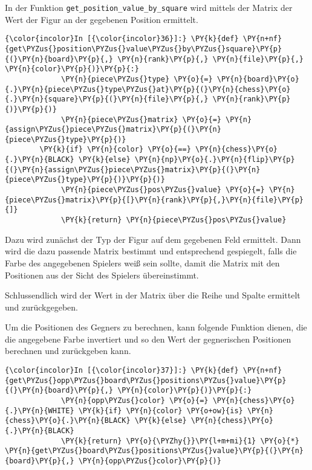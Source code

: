 In der Funktion \texttt{get\_position\_value\_by\_square} wird mittels
der Matrix der Wert der Figur an der gegebenen Position ermittelt.

    \begin{Verbatim}[commandchars=\\\{\}]
{\color{incolor}In [{\color{incolor}36}]:} \PY{k}{def} \PY{n+nf}{get\PYZus{}position\PYZus{}value\PYZus{}by\PYZus{}square}\PY{p}{(}\PY{n}{board}\PY{p}{,} \PY{n}{rank}\PY{p}{,} \PY{n}{file}\PY{p}{,} \PY{n}{color}\PY{p}{)}\PY{p}{:}
             \PY{n}{piece\PYZus{}type} \PY{o}{=} \PY{n}{board}\PY{o}{.}\PY{n}{piece\PYZus{}type\PYZus{}at}\PY{p}{(}\PY{n}{chess}\PY{o}{.}\PY{n}{square}\PY{p}{(}\PY{n}{file}\PY{p}{,} \PY{n}{rank}\PY{p}{)}\PY{p}{)}
             \PY{n}{piece\PYZus{}matrix} \PY{o}{=} \PY{n}{assign\PYZus{}piece\PYZus{}matrix}\PY{p}{(}\PY{n}{piece\PYZus{}type}\PY{p}{)} 
		\PY{k}{if} \PY{n}{color} \PY{o}{==} \PY{n}{chess}\PY{o}{.}\PY{n}{BLACK} \PY{k}{else} \PY{n}{np}\PY{o}{.}\PY{n}{flip}\PY{p}{(}\PY{n}{assign\PYZus{}piece\PYZus{}matrix}\PY{p}{(}\PY{n}{piece\PYZus{}type}\PY{p}{)}\PY{p}{)}
             \PY{n}{piece\PYZus{}pos\PYZus{}value} \PY{o}{=} \PY{n}{piece\PYZus{}matrix}\PY{p}{[}\PY{n}{rank}\PY{p}{,}\PY{n}{file}\PY{p}{]}
             \PY{k}{return} \PY{n}{piece\PYZus{}pos\PYZus{}value}
\end{Verbatim}

    Dazu wird zunächst der Typ der Figur auf dem gegebenen Feld ermittelt.
Dann wird die dazu passende Matrix bestimmt und entsprechend gespiegelt,
falls die Farbe des angegebenen Spielers weiß sein sollte, damit die
Matrix mit den Positionen aus der Sicht des Spielers übereinstimmt.

Schlussendlich wird der Wert in der Matrix über die Reihe und Spalte
ermittelt und zurückgegeben.

Um die Positionen des Gegners zu berechnen, kann folgende Funktion
dienen, die die angegebene Farbe invertiert und so den Wert der
gegnerischen Positionen berechnen und zurückgeben kann.

    \begin{Verbatim}[commandchars=\\\{\}]
{\color{incolor}In [{\color{incolor}37}]:} \PY{k}{def} \PY{n+nf}{get\PYZus{}opp\PYZus{}board\PYZus{}positions\PYZus{}value}\PY{p}{(}\PY{n}{board}\PY{p}{,} \PY{n}{color}\PY{p}{)}\PY{p}{:}
             \PY{n}{opp\PYZus{}color} \PY{o}{=} \PY{n}{chess}\PY{o}{.}\PY{n}{WHITE} \PY{k}{if} \PY{n}{color} \PY{o+ow}{is} \PY{n}{chess}\PY{o}{.}\PY{n}{BLACK} \PY{k}{else} \PY{n}{chess}\PY{o}{.}\PY{n}{BLACK}
             \PY{k}{return} \PY{o}{\PYZhy{}}\PY{l+m+mi}{1} \PY{o}{*} \PY{n}{get\PYZus{}board\PYZus{}positions\PYZus{}value}\PY{p}{(}\PY{n}{board}\PY{p}{,} \PY{n}{opp\PYZus{}color}\PY{p}{)}
\end{Verbatim}

